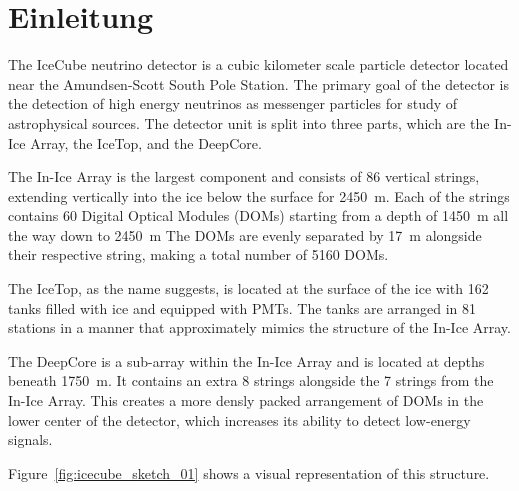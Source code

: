 \chapter{Einleitung}


The IceCube neutrino detector is a cubic kilometer scale particle detector located near the Amundsen-Scott South Pole Station. The primary goal of 
the detector is the detection of high energy neutrinos as messenger particles for study of astrophysical sources. The detector unit is split into three 
parts, which are the In-Ice Array, the IceTop, and the DeepCore. 

The In-Ice Array is the largest component and consists of 86 vertical strings, extending vertically into the ice below the surface for \SI{2450}{\metre}. 
Each of the strings contains 60 Digital Optical Modules (DOMs) starting from a depth of \SI{1450}{\metre} all the way down to \SI{2450}{\metre}
The DOMs are evenly separated by \SI{17}{\metre} alongside their respective string, making a total number of \num{5160} DOMs. 

The IceTop, as the name suggests, is located at the surface of the ice with \num{162} tanks filled with ice and equipped with PMTs. 
The tanks are arranged in 81 stations in a manner that approximately mimics the structure of the In-Ice Array. 

The DeepCore is a sub-array within the In-Ice Array and is located at depths beneath \SI{1750}{\metre}. It contains an extra \num{8} strings alongside the 
\num{7} strings from the In-Ice Array. This creates a more densly packed arrangement of DOMs in the lower center of the detector, which increases its 
ability to detect low-energy signals.

Figure~\ref{fig:icecube_sketch_01} shows a visual representation of this structure.

